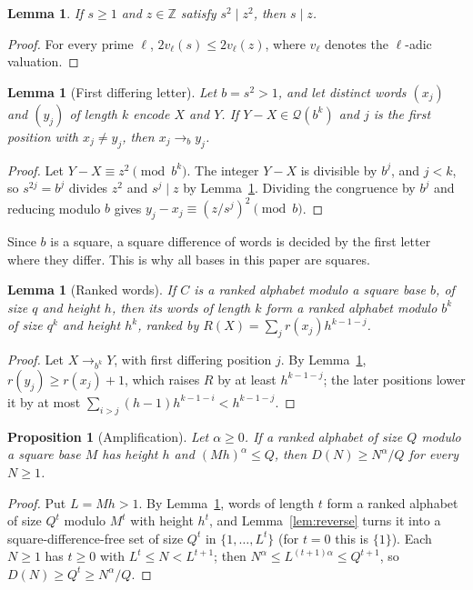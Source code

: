 \documentclass[11pt]{article}
\newtheorem{lemma}[theorem]{Lemma}
\newtheorem{proposition}[theorem]{Proposition}
\theoremstyle{definition}
\theoremstyle{remark}
\newcommand{\Z}{\mathbb Z}
\newcommand{\QR}{\mathcal Q}
\begin{document}
\begin{lemma}\label{lem:sqdiv}
If $s\ge1$ and $z\in\Z$ satisfy $s^2\mid z^2$, then $s\mid z$.
\end{lemma}
\begin{proof}
For every prime $\ell$, $2v_\ell(s)\le2v_\ell(z)$, where $v_\ell$ denotes
the $\ell$-adic valuation.
\end{proof}

\begin{lemma}[First differing letter]\label{lem:firstdiff}
Let $b=s^2>1$, and let distinct words $(x_j)$ and $(y_j)$ of length $k$
encode $X$ and $Y$. If $Y-X\in\QR(b^k)$ and $j$ is the first position with
$x_j\ne y_j$, then $x_j\to_by_j$.
\end{lemma}
\begin{proof}
Let $Y-X\equiv z^2\pmod{b^k}$. The integer $Y-X$ is divisible by $b^j$, and
$j<k$, so $s^{2j}=b^j$ divides $z^2$ and $s^j\mid z$ by
Lemma~\ref{lem:sqdiv}. Dividing the congruence by $b^j$ and reducing modulo
$b$ gives $y_j-x_j\equiv(z/s^j)^2\pmod b$.
\end{proof}
Since $b$ is a square, a square difference of words is decided by the first
letter where they differ. This is why all bases in this paper are squares.

\begin{lemma}[Ranked words]\label{lem:words}
If $C$ is a ranked alphabet modulo a square base $b$, of size $q$ and height
$h$, then its words of length $k$ form a ranked alphabet modulo $b^k$ of size
$q^k$ and height $h^k$, ranked by $R(X)=\sum_jr(x_j)h^{k-1-j}$.
\end{lemma}
\begin{proof}
Let $X\to_{b^k}Y$, with first differing position $j$. By
Lemma~\ref{lem:firstdiff}, $r(y_j)\ge r(x_j)+1$, which raises $R$ by at least
$h^{k-1-j}$; the later positions lower it by at most
$\sum_{i>j}(h-1)h^{k-1-i}<h^{k-1-j}$.
\end{proof}

\begin{proposition}[Amplification]\label{prop:amplify}
Let $\alpha\ge0$. If a ranked alphabet of size $Q$ modulo a square base $M$
has height $h$ and $(Mh)^\alpha\le Q$, then $D(N)\ge N^\alpha/Q$ for every
$N\ge1$.
\end{proposition}
\begin{proof}
Put $L=Mh>1$. By Lemma~\ref{lem:words}, words of length $t$ form a ranked
alphabet of size $Q^t$ modulo $M^t$ with height $h^t$, and
Lemma~\ref{lem:reverse} turns it into a square-difference-free set of size
$Q^t$ in $\{1,\ldots,L^t\}$ (for $t=0$ this is $\{1\}$). Each $N\ge1$ has
$t\ge0$ with $L^t\le N<L^{t+1}$; then $N^\alpha\le L^{(t+1)\alpha}\le Q^{t+1}$,
so $D(N)\ge Q^t\ge N^\alpha/Q$.
\end{proof}
\end{document}
